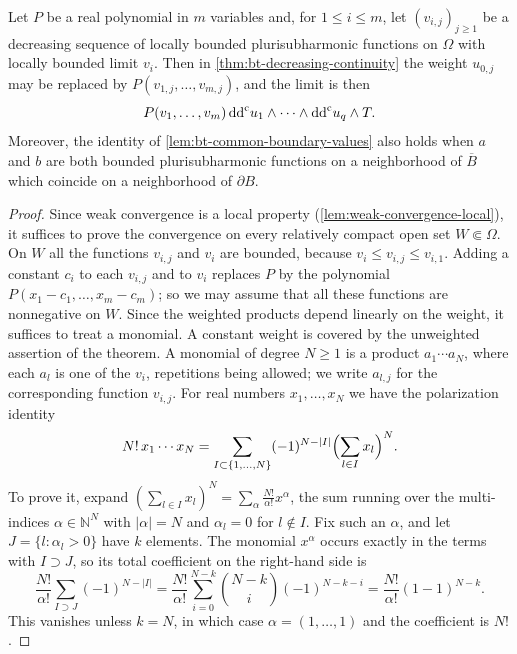 \begin{corollary}\label{cor:bt-polynomial-weights}
Let $P$ be a real polynomial in $m$ variables and, for $1\le i\le m$, let $(v_{i,j})_{j\ge1}$ be a decreasing sequence of locally bounded plurisubharmonic functions on $\Omega$ with locally bounded limit $v_i$. Then in \cref{thm:bt-decreasing-continuity} the weight $u_{0,j}$ may be replaced by $P(v_{1,j},\ldots,v_{m,j})$, and the limit is then
\[
 P(v_1,\ldots,v_m)\,\mathrm{dd}^{\mathrm{c}} u_1\wedge\cdots\wedge\mathrm{dd}^{\mathrm{c}} u_q\wedge T.
\]
Moreover, the identity of \cref{lem:bt-common-boundary-values} also holds when $a$ and $b$ are both bounded plurisubharmonic functions on a neighborhood of $\overline B$ which coincide on a neighborhood of $\partial B$.
\end{corollary}
\begin{proof}
Since weak convergence is a local property (\cref{lem:weak-convergence-local}), it suffices to prove the convergence on every relatively compact open set $W\Subset\Omega$. On $W$ all the functions $v_{i,j}$ and $v_i$ are bounded, because $v_i\le v_{i,j}\le v_{i,1}$. Adding a constant $c_i$ to each $v_{i,j}$ and to $v_i$ replaces $P$ by the polynomial $P(x_1-c_1,\ldots,x_m-c_m)$; so we may assume that all these functions are nonnegative on $W$. Since the weighted products depend linearly on the weight, it suffices to treat a monomial. A constant weight is covered by the unweighted assertion of the theorem. A monomial of degree $N\ge1$ is a product $a_1\cdots a_N$, where each $a_l$ is one of the $v_i$, repetitions being allowed; we write $a_{l,j}$ for the corresponding function $v_{i,j}$. For real numbers $x_1,\ldots,x_N$ we have the polarization identity
\begin{equation}\label{eq:bt-polarization-identity}
 N!\,x_1\cdots x_N=\sum_{I\subset\{1,\ldots,N\}}(-1)^{N-|I|}\Bigl(\sum_{l\in I}x_l\Bigr)^N.
\end{equation}
To prove it, expand $(\sum_{l\in I}x_l)^N=\sum_\alpha\frac{N!}{\alpha!}x^\alpha$, the sum running over the multi-indices $\alpha\in\mathbb N^N$ with $|\alpha|=N$ and $\alpha_l=0$ for $l\notin I$. Fix such an $\alpha$, and let $J=\{l:\alpha_l>0\}$ have $k$ elements. The monomial $x^\alpha$ occurs exactly in the terms with $I\supset J$, so its total coefficient on the right-hand side is
\[
 \frac{N!}{\alpha!}\sum_{I\supset J}(-1)^{N-|I|}=\frac{N!}{\alpha!}\sum_{i=0}^{N-k}\binom{N-k}{i}(-1)^{N-k-i}=\frac{N!}{\alpha!}(1-1)^{N-k}.
\]
This vanishes unless $k=N$, in which case $\alpha=(1,\ldots,1)$ and the coefficient is $N!$.


\end{proof}
